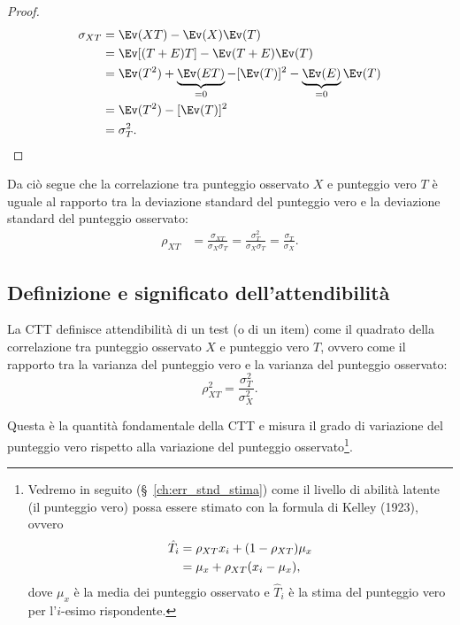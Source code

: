 \begin{proof}
\begin{align}
\sigma_{X T} &= \Ev(XT) - \Ev(X)\Ev(T)\notag\\
&=  \Ev[(T+E)T] - \Ev(T+E)\Ev(T)\notag\\
&=  \Ev(T^2) +  \underbrace{\Ev(ET)}_{=0} - [\Ev(T)]^2 -  \underbrace{\Ev(E)}_{=0} \Ev(T)\notag\\
&=\Ev(T^2) - [\Ev(T)]^2\notag \\
&= \sigma_T^2.
\end{align}
\end{proof}
\noindent
Da ciò segue che la correlazione tra punteggio osservato $X$ e punteggio vero $T$ è uguale al rapporto tra la deviazione standard del punteggio vero e la deviazione standard del punteggio osservato:
\begin{align}
\rho_{XT} &= \frac{\sigma_{XT}}{\sigma_X \sigma_T} = \frac{\sigma^2_{T}}{\sigma_X \sigma_T} = \frac{\sigma_{T}}{\sigma_X}.
\label{lab.sd.ratio}
\end{align}


\subsection{Definizione e significato dell'attendibilità}

\begin{defn}
La CTT definisce attendibilità di un test (o di un item) come il quadrato della correlazione tra punteggio osservato $X$ e punteggio vero $T$, ovvero come il rapporto tra la varianza del punteggio vero e la varianza del punteggio osservato:
\begin{equation}
\rho_{XT}^2 = \frac{\sigma_{T}^2}{\sigma_X^2}.
\label{eq:reliability_1}
\end{equation}
\end{defn}

\noindent
Questa è la quantità fondamentale della CTT e misura il grado di variazione del punteggio vero rispetto alla variazione del punteggio osservato\footnote{
Vedremo in seguito (\S~\ref{ch:err_stnd_stima}) come il livello di abilità latente (il punteggio vero) possa essere stimato con la formula di Kelley (1923), ovvero
\begin{align}
\hat{T}_i &= \rho_{XT} x_i + (1 - \rho_{XT})\mu_x\notag\\
&= \mu_x + \rho_{XT} (x_i - \mu_x),\notag
\end{align}
dove $\mu_x$ è la media dei punteggio osservato e $\hat{T}_i$ è la stima del punteggio vero per l'$i$-esimo rispondente.
}.

